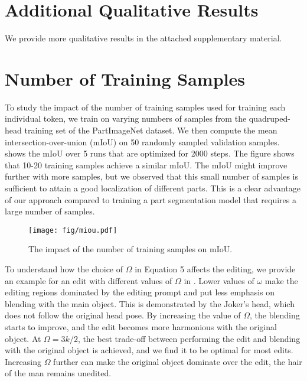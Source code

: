 \section{Additional Qualitative Results}
We provide more qualitative results in the attached supplementary material. 


\section{Number of Training Samples}
\label{sec:number_of_training_images}
To study the impact of the number of training samples used for training each individual token, we train on varying numbers of samples from the quadruped-head training set of the PartImageNet dataset. 
We then compute the mean intersection-over-union (mIoU) on 50 randomly sampled validation samples.
 shows the mIoU over 5 runs that are optimized for 2000 steps.
The figure shows that 10-20 training samples achieve a similar mIoU.
The mIoU might improve further with more samples, but we observed that this small number of samples is sufficient to attain a good localization of different parts.
This is a clear advantage of our approach compared to training a part segmentation model that requires a large number of samples.
\begin{figure}
    \centering
    \texttt{[image: fig/miou.pdf]}
    \caption{The impact of the number of training samples on mIoU.}
    \label{fig:num_samples}
\end{figure}

\label{sec:ablation_omega_adaptive_thresholding}
To understand how the choice of $\Omega$ in Equation 5 affects the editing, we provide an example for an edit with different values of $\Omega$ in .
Lower values of $\omega$ make the editing regions dominated by the editing prompt and put less emphasis on blending with the main object.
This is demonstrated by the Joker's head, which does not follow the original head pose.
By increasing the value of $\Omega$, the blending starts to improve, and the edit becomes more harmonious with the original object.
At $\Omega=3k/2$, the best trade-off between performing the edit and blending with the original object is achieved, and we find it to be optimal for most edits.
Increasing $\Omega$ further can make the original object dominate over the edit, \eg the hair of the man remains unedited. 

